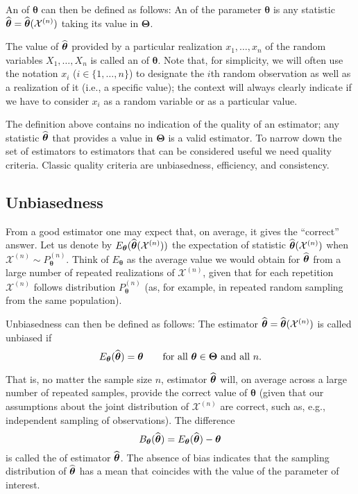 An \emph{} of $\boldsymbol\theta$ can then be defined as
follows: An  of the parameter $\boldsymbol\theta$ is any
statistic $\widehat{\boldsymbol\theta} =
\widehat{\boldsymbol\theta}(\mathcal{X}^{(n)})$ taking its value in
$\boldsymbol\Theta$.

The value of $\widehat{\boldsymbol\theta}$ provided by a particular realization
$x_1,\ldots,x_n$ of the random variables $X_1, \dots, X_n$ is called an
\emph{} of $\boldsymbol\theta$. Note that, for simplicity, we
will often use the notation $x_i$ ($i \in \{1, \dots, n\}$) to designate the
$i$th random observation as well as a realization of it (i.e., a specific
value); the context will always clearly indicate if we have to consider $x_i$
as a random variable or as a particular value.

The definition above contains no indication of the quality of an estimator; any
statistic $\widehat{\boldsymbol\theta}$ that provides a value in
$\boldsymbol\Theta$ is a valid estimator. To narrow down the set of estimators
to estimators that can be considered useful we need quality criteria. Classic
quality criteria are unbiasedness, efficiency, and consistency.

\subsection{Unbiasedness}
\Index[unbiasedness]{}

From a good estimator one may expect that, on average, it gives the “correct”
answer. Let us denote by
$E_{\boldsymbol\theta}(\widehat{\boldsymbol\theta}(\mathcal{X}^{(n)}))$ the
expectation of statistic $\widehat{\boldsymbol\theta}(\mathcal{X}^{(n)})$ when
$\mathcal{X}^{(n)} \sim P_{\boldsymbol\theta}^{(n)}$. Think of
$E_{\boldsymbol\theta}$ as the average value we would obtain for
$\widehat{\boldsymbol\theta}$ from a large number of repeated realizations of
$\mathcal{X}^{(n)}$, given that for each repetition $\mathcal{X}^{(n)}$ follows
distribution $P_{\boldsymbol\theta}^{(n)}$ (as, for example, in repeated random
sampling from the same population).

Unbiasedness can then be defined as follows:
The estimator $\widehat{\boldsymbol\theta} = \widehat{\boldsymbol\theta} 
(\mathcal{X}^{(n)})$ is called unbiased if
\[
    E_{\boldsymbol\theta}(\widehat{\boldsymbol\theta}) = \boldsymbol\theta
    \qquad
    \text{for all $\boldsymbol\theta \in \boldsymbol\Theta$ and all $n$}.
\]

That is, no matter the sample size $n$, estimator $\widehat{\boldsymbol\theta}$
will, on average across a large number of repeated samples, provide the correct
value of $\boldsymbol\theta$ (given that our assumptions about the joint distribution of
$\mathcal{X}^{(n)}$ are correct, such as, e.g., independent sampling of
observations). The difference
\[
    B_{\boldsymbol\theta}(\widehat{\boldsymbol\theta}) 
        = E_{\boldsymbol\theta}(\widehat{\boldsymbol\theta}) - \boldsymbol\theta
\]
is called the \emph{} of estimator $\widehat{\boldsymbol\theta}$.
The absence of bias indicates that the sampling distribution of
$\widehat{\boldsymbol\theta}$ has a mean that coincides with the value of the
parameter of interest.

